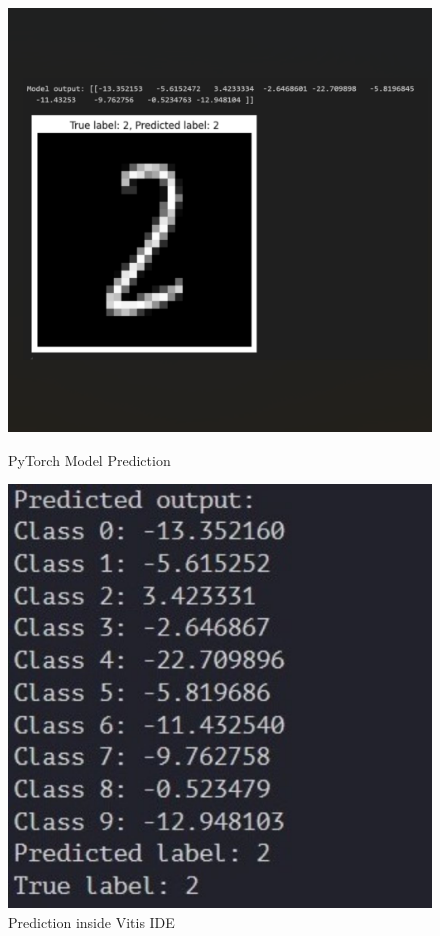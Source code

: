 \documentclass{article}
\begin{document}
\begin{figure}[H]
    \centering
    \begin{minipage}{0.49\textwidth}
        \centering
        \includegraphics[width=1\textwidth]{assets/ConvNet/torch-prediction.png}
        \caption{PyTorch Model Prediction}
        \label{fig:convnet-torch-prediction}
    \end{minipage}
    \hfill
    \begin{minipage}{0.49\textwidth}
        \centering
        \includegraphics[width=1\textwidth]{assets/ConvNet/vitis-model-prediction.jpg}
        \caption{Prediction inside Vitis IDE}
        \label{fig:convnet-vitis-prediction}
    \end{minipage}
\end{figure}
\end{document}
